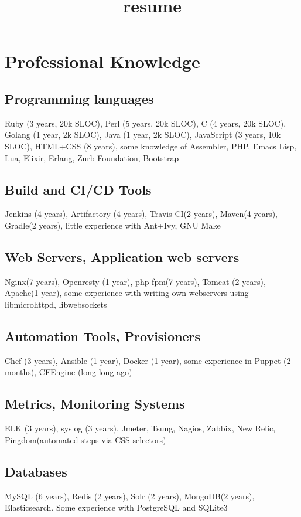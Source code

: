 \documentclass[letterpaper]{article}
\date{}
\title{resume}
\renewcommand\maketitle{}
\begin{document}
\maketitle
{}

\section{Professional Knowledge}
\label{sec-1}
\subsection{Programming languages}
\label{sec-1-1}
Ruby (3 years, 20k SLOC), Perl (5 years, 20k SLOC), C (4 years, 20k SLOC), Golang (1 year, 2k SLOC), Java (1 year, 2k SLOC), JavaScript (3 years, 10k SLOC), HTML+CSS (8 years), some knowledge of Assembler, PHP, Emacs Lisp, Lua, Elixir, Erlang, Zurb Foundation, Bootstrap
\subsection{Build and CI/CD Tools}
\label{sec-1-2}
Jenkins (4 years), Artifactory (4 years), Travis-CI(2 years), Maven(4 years), Gradle(2 years), little experience with Ant+Ivy, GNU Make
\subsection{Web Servers, Application web servers}
\label{sec-1-3}
Nginx(7 years), Openresty (1 year), php-fpm(7 years), Tomcat (2 years), Apache(1 year), some experience with writing own webservers using libmicrohttpd, libwebsockets
\subsection{Automation Tools, Provisioners}
\label{sec-1-4}
Chef (3 years), Ansible (1 year), Docker (1 year), some experience in Puppet (2 months), CFEngine (long-long ago)
\subsection{Metrics, Monitoring Systems}
\label{sec-1-5}
ELK (3 years), syslog (3 years), Jmeter, Tsung, Nagios, Zabbix, New Relic, Pingdom(automated steps via CSS selectors)
\subsection{Databases}
\label{sec-1-6}
MySQL (6 years), Redis (2 years), Solr (2 years), MongoDB(2 years), Elasticsearch. Some experience with PostgreSQL and SQLite3
\end{document}
